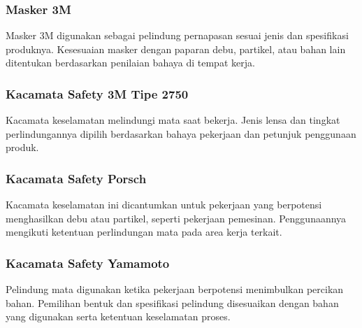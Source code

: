 
\Needspace{6.8cm}
\subsubsection{Masker 3M}

Masker 3M digunakan sebagai pelindung pernapasan sesuai jenis dan spesifikasi produknya. Kesesuaian masker dengan paparan debu, partikel, atau bahan lain ditentukan berdasarkan penilaian bahaya di tempat kerja.


\Needspace{6.8cm}
\subsubsection{Kacamata Safety 3M Tipe 2750}

Kacamata keselamatan melindungi mata saat bekerja. Jenis lensa dan tingkat perlindungannya dipilih berdasarkan bahaya pekerjaan dan petunjuk penggunaan produk.


\Needspace{6.8cm}
\subsubsection{Kacamata Safety Porsch}

Kacamata keselamatan ini dicantumkan untuk pekerjaan yang berpotensi menghasilkan debu atau partikel, seperti pekerjaan pemesinan. Penggunaannya mengikuti ketentuan perlindungan mata pada area kerja terkait.


\Needspace{6.8cm}
\subsubsection{Kacamata Safety Yamamoto}

Pelindung mata digunakan ketika pekerjaan berpotensi menimbulkan percikan bahan. Pemilihan bentuk dan spesifikasi pelindung disesuaikan dengan bahan yang digunakan serta ketentuan keselamatan proses.

